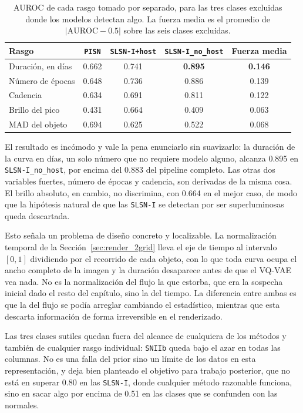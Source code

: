 \begin{table}[H]
\centering
\begin{tabular}{|l|c|c|c|c|}
\hline
\textbf{Rasgo} & \texttt{PISN} & \texttt{SLSN-I+host} & \texttt{SLSN-I\_no\_host} & \textbf{Fuerza media} \\
\hline
Duración, en días      & 0.662 & 0.741 & \textbf{0.895} & \textbf{0.146} \\
Número de épocas       & 0.648 & 0.736 & 0.886 & 0.139 \\
Cadencia               & 0.634 & 0.691 & 0.811 & 0.122 \\
Brillo del pico        & 0.431 & 0.664 & 0.409 & 0.063 \\
MAD del objeto         & 0.694 & 0.625 & 0.522 & 0.068 \\
\hline
\end{tabular}
\caption{AUROC de cada rasgo tomado por separado, para las tres clases excluidas donde los modelos detectan algo. La fuerza media es el promedio de $|\mathrm{AUROC} - 0.5|$ sobre las seis clases excluidas.}
\label{tab:heldout_rasgos}
\end{table}

El resultado es incómodo y vale la pena enunciarlo sin suavizarlo: la duración de la curva en días, un solo número que no requiere modelo alguno, alcanza 0.895 en \texttt{SLSN-I\_no\_host}, por encima del 0.883 del pipeline completo. Las otras dos variables fuertes, número de épocas y cadencia, son derivadas de la misma cosa. El brillo absoluto, en cambio, no discrimina, con 0.664 en el mejor caso, de modo que la hipótesis natural de que las \texttt{SLSN-I} se detectan por ser superluminosas queda descartada.

Esto señala un problema de diseño concreto y localizable. La normalización temporal de la Sección~\ref{sec:render_2grid} lleva el eje de tiempo al intervalo $[0,1]$ dividiendo por el recorrido de cada objeto, con lo que toda curva ocupa el ancho completo de la imagen y la duración desaparece antes de que el VQ-VAE vea nada. No es la normalización del flujo la que estorba, que era la sospecha inicial dado el resto del capítulo, sino la del tiempo. La diferencia entre ambas es que la del flujo se podía arreglar cambiando el estadístico, mientras que esta descarta información de forma irreversible en el renderizado.

Las tres clases sutiles quedan fuera del alcance de cualquiera de los métodos y también de cualquier rasgo individual: \texttt{SNIIb} queda bajo el azar en todas las columnas. No es una falla del prior sino un límite de los datos en esta representación, y deja bien planteado el objetivo para trabajo posterior, que no está en superar 0.80 en las \texttt{SLSN-I}, donde cualquier método razonable funciona, sino en sacar algo por encima de 0.51 en las clases que se confunden con las normales.

